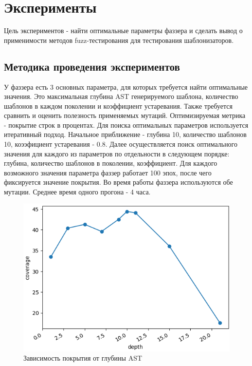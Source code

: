 \documentclass[a4paper]{article}
\begin{document}
\newpage
\section{Эксперименты}
\indent
Цель экспериментов - найти оптимальные параметры фаззера и сделать вывод о применимости методов fuzz-тестирования для тестирования шаблонизаторов.

\subsection{Методика проведения экспериментов}

У фаззера есть 3 основных параметра, для которых требуется найти оптимальные значения. Это максимальная глубина AST генерируемого шаблона, количество шаблонов в каждом поколении и коэффициент устаревания. Также требуется сравнить и оценить полезность применяемых мутаций. Оптимизируемая метрика - покрытие строк в процентах. Для поиска оптимальных параметров используется итеративный подход. Начальное приближение - глубина 10, количество шаблонов 10, коээфициент устаревания - 0.8. Далее осуществляется поиск оптимального значения для каждого из параметров по отдельности в следующем порядке: глубина, количество шаблонов в поколении, коэффициент. Для каждого возможного значения параметра фаззер работает 100 эпох, после чего фиксируется значение покрытия. Во время работы фаззера используются обе мутации. Среднее время одного прогона - 4 часа. 

\begin{figure}[ht!]
    \includegraphics[width=170mm]{depth.png}
    \caption{Зависимость покрытия от глубины AST}
    \label{Depth}
    \end{figure}
\end{document}
